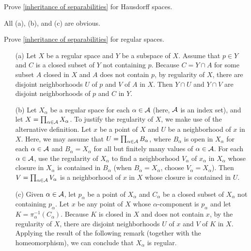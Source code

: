 \begin{prob}\label{inheritance: Hausdorff}
    Prove \cref{inheritance of separabilities} for Hausdorff spaces.
\end{prob}
\begin{sol}
    All (a), (b), and (c) are obvious.
\end{sol}

\begin{prob}\label{inheritance: regular}
    Prove \cref{inheritance of separabilities} for regular spaces.
\end{prob}
\begin{sol}
    \begin{enumerate}
        \item[(a)]
        {
            Let $X$ be a regular space and $Y$ be a subspace of $X$.
            Assume that $p\in Y$ and $C$ is a closed subset of $Y$ not containing $p$.
            Because $C=Y\cap A$ for some subset $A$ closed in $X$ and $A$ does not contain $p$, by regularity of $X$, there are disjoint neighborhoods $U$ of $p$ and $V$ of $A$ in $X$.
            Then $Y\cap U$ and $Y\cap V$ are disjoint neighborhoods of $p$ and $C$ in $Y$.
        }
        \item[(b)]
        {
            Let $X_\alpha$ be a regular space for each $\alpha\in{\mathcal{A}}$ (here, ${\mathcal{A}}$ is an index set), and let $X=\prod_{\alpha\in{\mathcal{A}}} X_\alpha$.
            To justify the regularity of $X$, we make use of the alternative definition.
            Let $x$ be a point of $X$ and $U$ be a neighborhood of $x$ in $X$.
            Here, we may assume that $U=\prod_{\alpha\in{\mathcal{A}}} B_\alpha$, where $B_\alpha$ is open in $X_\alpha$ for each $\alpha\in{\mathcal{A}}$ and $B_\alpha=X_\alpha$ for all but finitely many values of $\alpha\in{\mathcal{A}}$.
            For each $\alpha\in{\mathcal{A}}$, use the regularity of $X_\alpha$ to find a neighborhood $V_\alpha$ of $x_\alpha$ in $X_\alpha$ whose closure in $X_\alpha$ is contained in $B_\alpha$ (when $B_\alpha=X_\alpha$, choose $V_\alpha=X_\alpha$).
            Then $V=\prod_{\alpha\in{\mathcal{A}}} V_\alpha$ is a neighborhood of $x$ in $X$ whose closure is contained in $U$.
        }
        \item[(c)]
        {
            Given $\alpha\in{\mathcal{A}}$, let $p_\alpha$ be a point of $X_\alpha$ and $C_\alpha$ be a closed subset of $X_\alpha$ not containing $p_\alpha$.
            Let $x$ be any point of $X$ whose $\alpha$-component is $p_\alpha$ and let $K=\pi_\alpha^{-1} (C_\alpha)$.
            Because $K$ is closed in $X$ and does not contain $x$, by the regularity of $X$, there are disjoint neighborhoods $U$ of $x$ and $V$ of $K$ in $X$.
            Applying the result of the following remark (together with the homeomorphism), we can conclude that $X_\alpha$ is regular.
        }
    \end{enumerate}
\end{sol}

